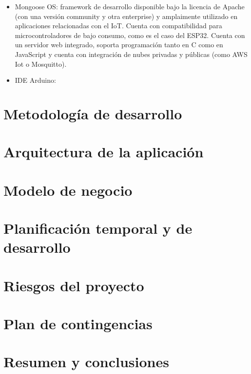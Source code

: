 \documentclass[runningheads]{llncs}
\begin{document}
\begin{itemize}
    \item Mongoose OS: framework de desarrollo disponible bajo la licencia de Apache (con una versión community y otra enterprise) y amplaimente utilizado en aplicaciones relacionadas con el IoT. Cuenta con compatibilidad para microcontroladores de bajo consumo, como es el caso del ESP32. Cuenta con un servidor web integrado, soporta programación tanto en C como en JavaScript y cuenta con integración de nubes privadas y públicas (como AWS Iot o Mosquitto).
    
    \item IDE Arduino:
    
    
\end{itemize}

\section{Metodología de desarrollo}

\section{Arquitectura de la aplicación}

\section{Modelo de negocio}

\section{Planificación temporal y de desarrollo}

\section{Riesgos del proyecto}

\section{Plan de contingencias}

\section{Resumen y conclusiones}
\end{document}
